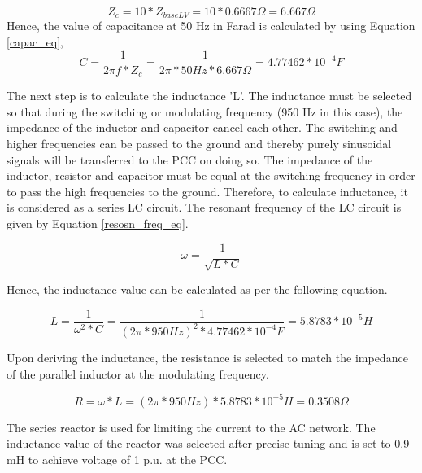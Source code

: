 \begin{equation}
    Z_c = 10 * Z_{baseLV} = 10 * 0.6667 \Omega = 6.667 \Omega   
\end{equation}
Hence, the value of capacitance at 50 Hz in Farad is calculated by using Equation \ref{capac_eq},
\begin{equation}\label{capac_eq}
    C = \frac{1}{2\pi f *Z_c} = \frac{1}{2\pi*50 Hz*6.667\Omega} = 4.77462*10^{-4} F
\end{equation}

The next step is to calculate the inductance 'L'. The inductance must be selected so that during the switching or modulating frequency (950 Hz in this case), the impedance of the inductor and capacitor cancel each other. The switching and higher frequencies can be passed to the ground and thereby purely sinusoidal signals will be transferred to the \gls{PCC} on doing so. The impedance of the inductor, resistor and capacitor must be equal at the switching frequency in order to pass the high frequencies to the ground. Therefore, to calculate inductance, it is considered as a series LC circuit. The resonant frequency of the LC circuit is given by Equation \ref{resosn_freq_eq}.

\begin{equation}\label{resosn_freq_eq}
    \omega = \frac{1}{\sqrt{L*C}}    
\end{equation}

Hence, the inductance value can be calculated as per the following equation.

\begin{equation}
    L = \frac{1}{\omega^2*C} = \frac{1}{(2\pi * 950 Hz)^2* 4.77462*10^{-4} F} = 5.8783*10^{-5} H
\end{equation}

Upon deriving the inductance, the resistance is selected to match the impedance of the parallel inductor at the modulating frequency.

\begin{equation}
    R = \omega* L = (2\pi*950 Hz)*5.8783*10^{-5} H = 0.3508 \Omega
\end{equation}

The series reactor is used for limiting the current to the \gls{AC} network. The inductance value of the reactor was selected after precise tuning and is set to 0.9 mH to achieve voltage of 1 p.u. at the \gls{PCC}.

